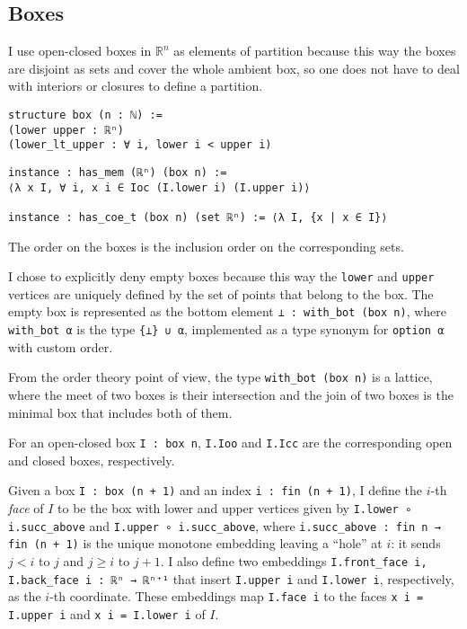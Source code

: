 \documentclass[a4paper,UKenglish,cleveref, autoref, thm-restate]{lipics-v2021}
\newcommand{\bbR}{\mathbb{R}}
\begin{document}
\subsection{Boxes}\label{sec:boxes}

I use open-closed boxes in \(\bbR^{n}\) as elements of partition
because this way the boxes are disjoint as sets and cover the whole
ambient box, so one does not have to deal with interiors or closures
to define a partition.

\begin{lstlisting}[caption=Definition of a box]
structure box (n : ℕ) :=
(lower upper : ℝⁿ)
(lower_lt_upper : ∀ i, lower i < upper i)
\end{lstlisting}

\begin{lstlisting}[caption=The set defined by a box]
instance : has_mem (ℝⁿ) (box n) :=
⟨λ x I, ∀ i, x i ∈ Ioc (I.lower i) (I.upper i)⟩

instance : has_coe_t (box n) (set ℝⁿ) := ⟨λ I, {x | x ∈ I}⟩
\end{lstlisting}
The order on the boxes is the inclusion order on the corresponding
sets.

I chose to explicitly deny empty boxes because this way the
\lstinline{lower} and \lstinline{upper} vertices are uniquely defined
by the set of points that belong to the box. The empty box is
represented as the bottom element \lstinline{⊥ : with_bot (box n)},
where \lstinline{with_bot α} is the type \lstinline={⊥} ∪ α=,
implemented as a type synonym for \lstinline{option α} with custom order.

From the order theory point of view, the type
\lstinline=with_bot (box n)= is a lattice, where the meet of two boxes
is their intersection and the join of two boxes is the minimal box
that includes both of them.

For an open-closed box \lstinline{I : box n}, \lstinline{I.Ioo} and
\lstinline{I.Icc} are the corresponding open and closed boxes,
respectively.

Given a box \lstinline=I : box (n + 1)= and an index
\lstinline=i : fin (n + 1)=, I define the \(i\)-th \emph{face} of
\(I\) to be the box with lower and upper vertices given by
\lstinline=I.lower ∘ i.succ_above= and
\lstinline=I.upper ∘ i.succ_above=, where
\lstinline=i.succ_above : fin n → fin (n + 1)= is the unique monotone
embedding leaving a \enquote{hole} at \(i\): it sends \(j<i\) to \(j\)
and \(j\ge i\) to \(j+1\). I also define two embeddings
\lstinline=I.front_face i, I.back_face i : ℝⁿ → ℝⁿ⁺¹= that insert
\lstinline=I.upper i= and \lstinline=I.lower i=, respectively, as the
\(i\)-th coordinate. These embeddings map \lstinline=I.face i= to
the faces \lstinline+x i = I.upper i+ and \lstinline+x i = I.lower i+
of \(I\).
\end{document}
